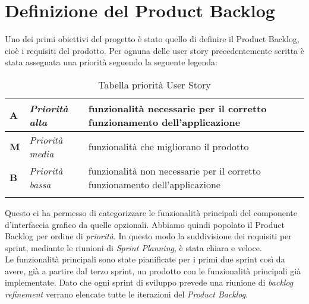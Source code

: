 \section{Definizione del Product Backlog}
Uno dei primi obiettivi del progetto è stato quello di definire il Product Backlog, cioè i requisiti del prodotto. Per ognuna delle user story precedentemente scritta è stata assegnata una priorità seguendo la seguente legenda:
\begin{longtable} {
		|>{\centering}p{10mm}| 
		|>{}p{25mm}|
		|>{}p{85mm}|
		>{}p{0mm}}
	\hline
	\textbf{A} & \textit{Priorità alta}  & funzionalità necessarie per il corretto funzionamento dell'applicazione \\ \hline
	\textbf{M} & \textit{Priorità media} & funzionalità che migliorano il prodotto \\ \hline
	\textbf{B} & \textit{Priorità bassa} & funzionalità non necessarie per il corretto funzionamento dell'applicazione \\ \hline
	\hline
	\caption{Tabella priorità User Story}
\end{longtable}
\noindent
Questo ci ha permesso di categorizzare le funzionalità principali del componente d'interfaccia grafico da quelle opzionali. Abbiamo quindi popolato il Product Backlog per ordine di \textit{priorità}. In questo modo la suddivisione dei requisiti per sprint, mediante le riunioni di \textit{Sprint Planning}, è stata chiara e veloce. \\
Le funzionalità principali sono state pianificate per i primi due sprint così da avere, già a partire dal terzo sprint, un prodotto con le funzionalità principali già implementate. Dato che ogni sprint di sviluppo prevede una riunione di \emph{backlog refinement} verrano elencate tutte le iterazioni del \emph{Product Backlog}.

